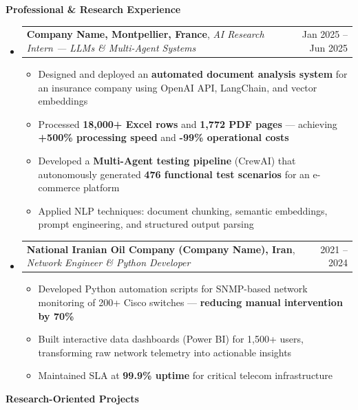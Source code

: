 \documentclass[11pt,a4paper]{article}
\makeatletter
\newcommand{\itemspace}{\vspace{0.4em}}
\newcommand{\sectionspace}{\itemspace}
\newcommand{\subspace}{\vspace{0.5em}}
\newcommand{\cvsection}[1]{
    \sectionspace
    \noindent\textcolor{primary}{\Large \textbf{#1}} \textcolor{primary}{\hrulefill}
    \par\vspace{0.4em}
}
\newcommand{\headerrow}[2]{
    \begin{tabular*}{\linewidth}{l@{\extracolsep{\fill}}r}
    #1 & \textcolor{primary}{#2} \\
    \end{tabular*}
}
\makeatother
\begin{document}
\cvsection{Professional \& Research Experience}
\begin{itemize}[leftmargin=1em, label={}]
    \item
    \headerrow{\textbf{Company Name, Montpellier, France}, \emph{AI Research Intern — LLMs \& Multi-Agent Systems}}{Jan 2025 -- Jun 2025}
    \begin{itemize}[leftmargin=1.5em, label=$\bullet$, nosep]
        \item Designed and deployed an \textbf{automated document analysis system} for an insurance company using OpenAI API, LangChain, and vector embeddings
        \item Processed \textbf{18,000+ Excel rows} and \textbf{1,772 PDF pages} — achieving \textbf{+500\% processing speed} and \textbf{-99\% operational costs}
        \item Developed a \textbf{Multi-Agent testing pipeline} (CrewAI) that autonomously generated \textbf{476 functional test scenarios} for an e-commerce platform
        \item Applied NLP techniques: document chunking, semantic embeddings, prompt engineering, and structured output parsing
    \end{itemize}

    \subspace 
    \item
    \headerrow{\textbf{National Iranian Oil Company (Company Name), Iran}, \emph{Network Engineer \& Python Developer}}{2021 -- 2024}
    \begin{itemize}[leftmargin=1.5em, label=$\bullet$, nosep]
        \item Developed Python automation scripts for SNMP-based network monitoring of 200+ Cisco switches — \textbf{reducing manual intervention by 70\%}
        \item Built interactive data dashboards (Power BI) for 1,500+ users, transforming raw network telemetry into actionable insights
        \item Maintained SLA at \textbf{99.9\% uptime} for critical telecom infrastructure
    \end{itemize}
\end{itemize}

\clearpage
\cvsection{Research-Oriented Projects}
\end{document}
